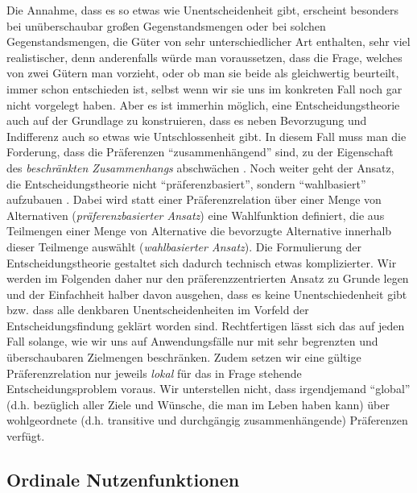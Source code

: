 Die Annahme, dass es so etwas wie Unentscheidenheit gibt, erscheint besonders bei
unüberschaubar großen Gegenstandsmengen oder bei solchen Gegenstandsmengen, die
Güter von sehr unterschiedlicher Art enthalten, sehr viel realistischer, denn
anderenfalls würde man voraussetzen, dass die Frage, welches von zwei Gütern man
vorzieht, oder ob man sie beide als gleichwertig beurteilt, immer schon
entschieden ist, selbst wenn wir sie uns im konkreten Fall noch gar nicht
vorgelegt haben. Aber es ist immerhin möglich, eine Entscheidungstheorie auch auf
der Grundlage zu konstruieren, dass es neben Bevorzugung und Indifferenz auch so
etwas wie Untschlossenheit gibt. In diesem Fall muss man die Forderung, dass die
Präferenzen "`zusammenhängend"' sind, zu der Eigenschaft des {\em beschränkten
Zusammenhangs} abschwächen \cite[S. 13, 24]{kaplan:1996}. Noch weiter geht der
Ansatz, die Entscheidungstheorie nicht "`präferenzbasiert"', sondern
"`wahlbasiert"' aufzubauen \cite[SEITE???]{mascolell-whinston-green:1995}.
Dabei wird statt einer Präferenzrelation über einer Menge
von Alternativen ({\em präferenzbasierter Ansatz}) eine Wahlfunktion definiert,
die aus Teilmengen einer Menge von Alternative die bevorzugte Alternative
innerhalb dieser Teilmenge auswählt ({\em wahlbasierter Ansatz}). Die
Formulierung der Entscheidungstheorie gestaltet sich dadurch technisch etwas
komplizierter. Wir werden im Folgenden daher nur den präferenzzentrierten Ansatz
zu Grunde legen und der Einfachheit halber davon ausgehen, dass es keine
Unentschiedenheit gibt bzw. dass alle denkbaren Unentscheidenheiten im Vorfeld
der Entscheidungsfindung geklärt worden sind. Rechtfertigen lässt sich das auf
jeden Fall solange, wie wir uns auf Anwendungsfälle nur mit sehr begrenzten und
überschaubaren Zielmengen beschränken. Zudem setzen wir eine gültige
Präferenzrelation nur jeweils {\em lokal} für das in Frage stehende
Entscheidungsproblem voraus. Wir unterstellen nicht, dass irgendjemand "`global"'
(d.h. bezüglich aller Ziele und Wünsche, die man im Leben haben kann) über
wohlgeordnete (d.h. transitive und durchgängig zusammenhängende) Präferenzen
verfügt.

\subsection{Ordinale Nutzenfunktionen}

